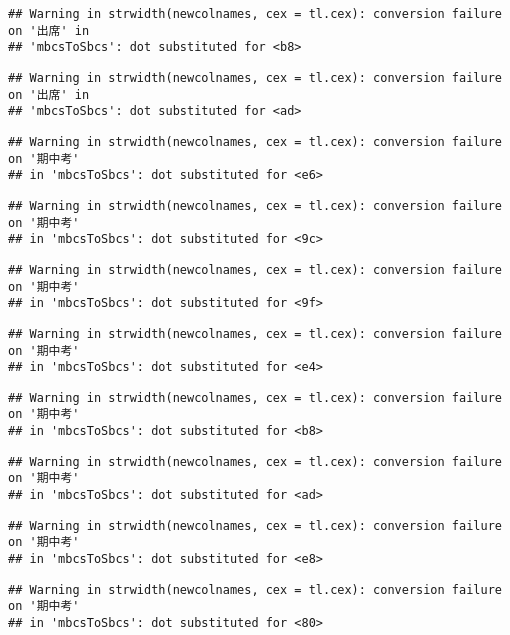 \documentclass[
]{book}
\begin{document}
\begin{verbatim}
## Warning in strwidth(newcolnames, cex = tl.cex): conversion failure on '出席' in
## 'mbcsToSbcs': dot substituted for <b8>
\end{verbatim}

\begin{verbatim}
## Warning in strwidth(newcolnames, cex = tl.cex): conversion failure on '出席' in
## 'mbcsToSbcs': dot substituted for <ad>
\end{verbatim}

\begin{verbatim}
## Warning in strwidth(newcolnames, cex = tl.cex): conversion failure on '期中考'
## in 'mbcsToSbcs': dot substituted for <e6>
\end{verbatim}

\begin{verbatim}
## Warning in strwidth(newcolnames, cex = tl.cex): conversion failure on '期中考'
## in 'mbcsToSbcs': dot substituted for <9c>
\end{verbatim}

\begin{verbatim}
## Warning in strwidth(newcolnames, cex = tl.cex): conversion failure on '期中考'
## in 'mbcsToSbcs': dot substituted for <9f>
\end{verbatim}

\begin{verbatim}
## Warning in strwidth(newcolnames, cex = tl.cex): conversion failure on '期中考'
## in 'mbcsToSbcs': dot substituted for <e4>
\end{verbatim}

\begin{verbatim}
## Warning in strwidth(newcolnames, cex = tl.cex): conversion failure on '期中考'
## in 'mbcsToSbcs': dot substituted for <b8>
\end{verbatim}

\begin{verbatim}
## Warning in strwidth(newcolnames, cex = tl.cex): conversion failure on '期中考'
## in 'mbcsToSbcs': dot substituted for <ad>
\end{verbatim}

\begin{verbatim}
## Warning in strwidth(newcolnames, cex = tl.cex): conversion failure on '期中考'
## in 'mbcsToSbcs': dot substituted for <e8>
\end{verbatim}

\begin{verbatim}
## Warning in strwidth(newcolnames, cex = tl.cex): conversion failure on '期中考'
## in 'mbcsToSbcs': dot substituted for <80>
\end{verbatim}
\end{document}
